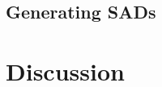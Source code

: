 \documentclass[12pt]{article}
\begin{document}
\subsection*{Generating SADs}



\section*{Discussion}
\end{document}
